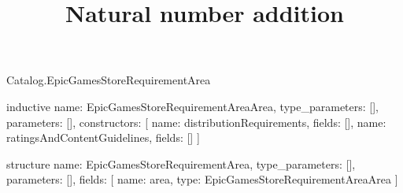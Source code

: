 \begin{lexlean}{Catalog.EpicGamesStoreRequirementArea}
\title{Natural number addition}
\begin{semanticmodule}
inductive{
  name: EpicGamesStoreRequirementAreaArea,
  type_parameters: [],
  parameters: [],
  constructors: [
    {name: distributionRequirements, fields: []},
    {name: ratingsAndContentGuidelines, fields: []}
  ]
}

structure{
  name: EpicGamesStoreRequirementArea,
  type_parameters: [],
  parameters: [],
  fields: [
    {name: area, type: EpicGamesStoreRequirementAreaArea}
  ]
}
\end{semanticmodule}
\end{lexlean}
